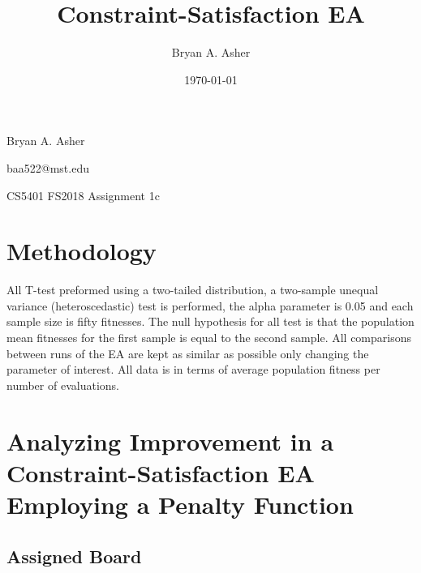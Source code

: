 \documentclass{article}
\title{Constraint-Satisfaction EA}
\author{Bryan A. Asher}
\date{\today}
\begin{document}
Bryan A. Asher

baa522@mst.edu

CS5401 FS2018 Assignment 1c

\maketitle




\section{Methodology}
All T-test preformed using a two-tailed distribution, a two-sample unequal variance (heteroscedastic) test is performed, the alpha parameter is 0.05 and each sample size is fifty fitnesses. The null hypothesis for all test is that the population mean fitnesses for the first sample is equal to the second sample. All comparisons between runs of the EA are kept as similar as possible only changing the parameter of interest. All data is in terms of average population fitness per number of evaluations.

\section{Analyzing Improvement in a Constraint-Satisfaction EA Employing a Penalty Function}

	\subsection{Assigned Board}
\end{document}
